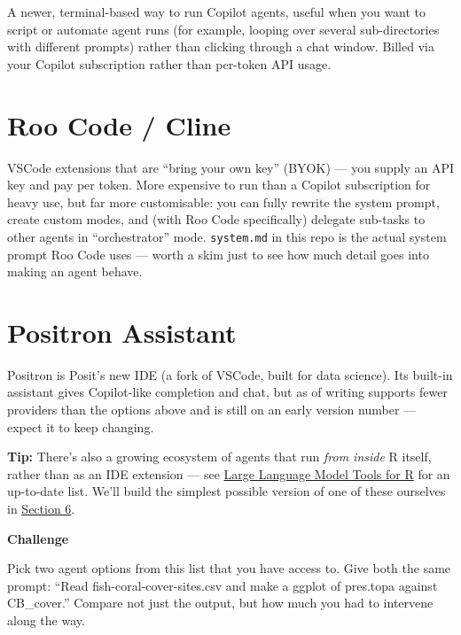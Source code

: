 \documentclass[
  letterpaper,
  DIV=11,
  numbers=noendperiod]{scrreprt}
\begin{document}
A newer, terminal-based way to run Copilot agents, useful when you want
to script or automate agent runs (for example, looping over several
sub-directories with different prompts) rather than clicking through a
chat window. Billed via your Copilot subscription rather than per-token
API usage.

\section{Roo Code / Cline}\label{roo-code-cline}

VSCode extensions that are ``bring your own key'' (BYOK) --- you supply
an API key and pay per token. More expensive to run than a Copilot
subscription for heavy use, but far more customisable: you can fully
rewrite the system prompt, create custom modes, and (with Roo Code
specifically) delegate sub-tasks to other agents in ``orchestrator''
mode. \texttt{system.md} in this repo is the actual system prompt Roo
Code uses --- worth a skim just to see how much detail goes into making
an agent behave.

\section{Positron Assistant}\label{positron-assistant}

Positron is Posit's new IDE (a fork of VSCode, built for data science).
Its built-in assistant gives Copilot-like completion and chat, but as of
writing supports fewer providers than the options above and is still on
an early version number --- expect it to keep changing.

\textbf{Tip:} There's also a growing ecosystem of agents that run
\emph{from inside} R itself, rather than as an IDE extension --- see
\href{https://luisdva.github.io/llmsr-book/r-pkgs.html\#language-model-agents}{Large
Language Model Tools for R} for an up-to-date list. We'll build the
simplest possible version of one of these ourselves in
\href{../section-6-api-access/05-make-an-agent.qmd}{Section 6}.

\begin{tcolorbox}[enhanced jigsaw, toprule=.15mm, rightrule=.15mm, left=2mm, leftrule=.75mm, breakable, opacityback=0, arc=.35mm, colframe=quarto-callout-important-color-frame, bottomrule=.15mm, colback=white]
\begin{minipage}[t]{5.5mm}
\textcolor{quarto-callout-important-color}{\faExclamation}
\end{minipage}%
\begin{minipage}[t]{\textwidth - 5.5mm}

\vspace{-3mm}\textbf{Challenge}\vspace{3mm}

Pick two agent options from this list that you have access to. Give both
the same prompt: ``Read fish-coral-cover-sites.csv and make a ggplot of
pres.topa against CB\_cover.'' Compare not just the output, but how much
you had to intervene along the way.

\end{minipage}%
\end{tcolorbox}
\end{document}
